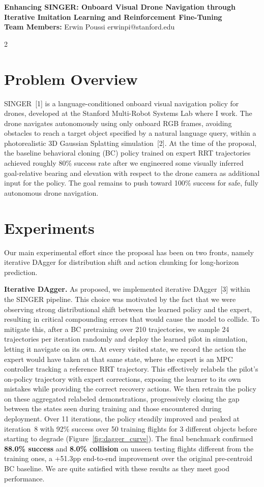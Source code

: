 \documentclass{article}
\makeatletter
\renewcommand{\maketitle}{
  \begin{center}
    {\bf \large Enhancing SINGER: Onboard Visual Drone Navigation through Iterative Imitation Learning and Reinforcement Fine-Tuning}\\
    \vspace{0.05cm}
    {\bf Team Members:} Erwin Poussi \quad {\bf Email:} erwinpi@stanford.edu\\
    \vspace{0.1cm}
  \end{center}
}
\makeatother
\begin{document}
\maketitle
\vspace{-0.3cm}

\begin{multicols}{2}

\section{Problem Overview}

SINGER~[1] is a language-conditioned onboard visual navigation policy for drones, developed at the Stanford Multi-Robot Systems Lab where I work. The drone navigates autonomously using only onboard RGB frames, avoiding obstacles to reach a target object specified by a natural language query, within a photorealistic 3D Gaussian Splatting simulation~[2]. At the time of the proposal, the baseline behavioral cloning (BC) policy trained on expert RRT trajectories achieved roughly 80\% success rate after we engineered some visually inferred goal-relative bearing and elevation with respect to the drone camera as additional input for the policy. The goal remains to push toward 100\% success for safe, fully autonomous drone navigation.

\section{Experiments}

Our main experimental effort since the proposal has been on two fronts, namely iterative DAgger for distribution shift and action chunking for long-horizon prediction.

\textbf{Iterative DAgger.}
As proposed, we implemented iterative DAgger~[3] within the SINGER pipeline. This choice was motivated by the fact that we were observing strong distributional shift between the learned policy and the expert, resulting in critical compounding errors that would cause the model to collide. To mitigate this, after a BC pretraining over 210 trajectories, we sample 24 trajectories per iteration randomly and deploy the learned pilot in simulation, letting it navigate on its own. At every visited state, we record the action the expert would have taken at that same state, where the expert is an MPC controller tracking a reference RRT trajectory. This effectively relabels the pilot's on-policy trajectory with expert corrections, exposing the learner to its own mistakes while providing the correct recovery actions. We then retrain the policy on these aggregated relabeled demonstrations, progressively closing the gap between the states seen during training and those encountered during deployment. Over 11 iterations, the policy steadily improved and peaked at iteration~8 with 92\% success over 50 training flights for 3 different objects before starting to degrade (Figure~\ref{fig:dagger_curve}). The final benchmark confirmed \textbf{88.0\% success} and \textbf{8.0\% collision} on unseen testing flights different from the training ones, a +51.3pp end-to-end improvement over the original pre-centroid BC baseline. We are quite satisfied with these results as they meet good performance.


\end{multicols}
\end{document}
